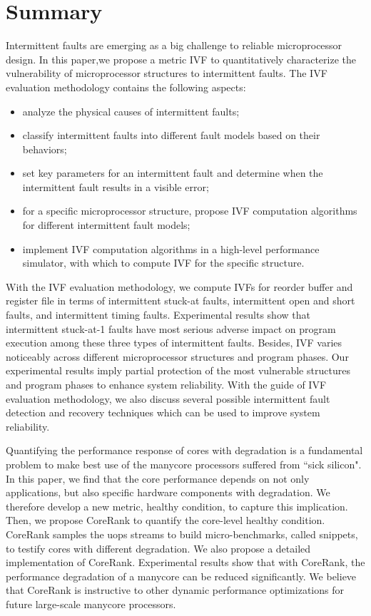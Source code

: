 \section{Summary}
Intermittent faults are emerging as a big challenge to reliable microprocessor design. In this paper,we propose a metric IVF to quantitatively characterize the vulnerability of microprocessor structures to intermittent faults. The IVF evaluation methodology contains the following aspects: 
\begin{itemize}
    \item analyze the physical causes of intermittent faults;
    \item classify intermittent faults into different fault models based on their behaviors;
    \item set key parameters for an intermittent fault and determine when the intermittent fault results in a visible error;
    \item for a specific microprocessor structure, propose IVF computation algorithms for different intermittent fault models;
    \item implement IVF computation algorithms in a high-level performance simulator, with which to compute IVF for the specific structure.
\end{itemize}

With the IVF evaluation methodology, we compute IVFs for reorder buffer and register file in terms of intermittent stuck-at faults, intermittent open and short faults, and intermittent timing faults. Experimental results show that intermittent stuck-at-1 faults have most serious adverse impact on program execution among these three types of intermittent faults. Besides, IVF varies noticeably across different microprocessor structures and program phases. Our experimental results imply partial protection of the most vulnerable structures and program phases to enhance system reliability. With the guide of IVF evaluation methodology, we also discuss several possible intermittent fault detection and recovery techniques which can be used to improve system reliability.

Quantifying the performance response of cores with degradation is a fundamental problem to make best use of the manycore processors suffered from ``sick silicon". In this paper, we find that the core performance depends on not only applications, but also specific hardware components with degradation. We therefore develop a new metric, healthy condition, to capture this implication. Then, we propose CoreRank to quantify the core-level healthy condition. CoreRank samples the uops streams to build micro-benchmarks, called snippets,  to testify  cores with different degradation. We also propose a detailed implementation of CoreRank. Experimental results show that with CoreRank, the performance degradation of a manycore can be reduced significantly. We believe that CoreRank is instructive to other dynamic performance optimizations for future large-scale manycore processors.





